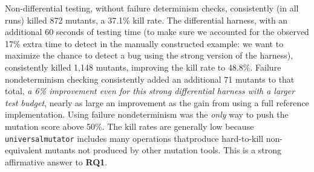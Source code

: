 {Non-differential testing, without failure determinism checks,
consistently (in all runs) killed
872 mutants, a 37.1\% kill rate.
The differential harness, with an additional 60 seconds of testing
time (to make sure we accounted for the observed 17\%
extra time to detect in the manually constructed example: we want to
maximize the chance to detect a bug using the strong version of the harness), consistently killed 1,148 mutants, improving the kill rate to 48.8\%.  Failure
nondeterminism checking consistently added an
additional 71 mutants to that total, \emph{a 6\% improvement even for
this strong differential harness with a larger test budget}, nearly as
large an improvement as the gain from using a full reference
implementation.  Using
failure nondeterminism was the \emph{only} way to push the mutation score
above 50\%.  The kill rates are generally low
because {\tt universalmutator} includes many operations
thatproduce hard-to-kill
non-equivalent mutants not produced by other mutation tools.  This is a strong affirmative answer to {\bf
  RQ1}.

}
